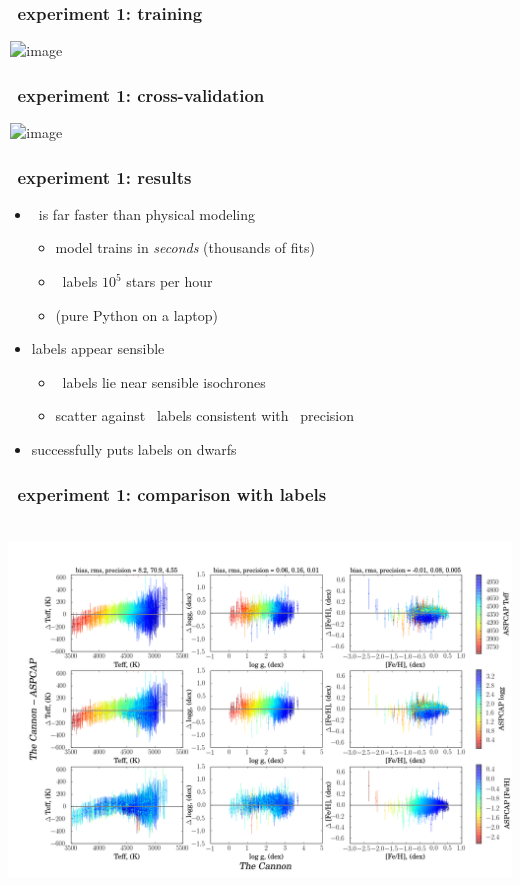 \documentclass[pdftex]{beamer}
\begin{document}
\begin{frame}
  \frametitle{\tc\ experiment 1: training}
  \,\hfill\includegraphics<1>[height=\figureheight]{../documents/paper1/plots/R1_continuum5.png}
\end{frame}

\begin{frame}
  \frametitle{\tc\ experiment 1: cross-validation}
  \,\hfill\includegraphics<1>[height=\figureheight]{../documents/paper1/plots/takeout_histc.png}
\end{frame}

\newcommand{\results}{%
\begin{frame}
  \frametitle{\tc\ experiment 1: results}
  \begin{itemize}
  \item \tc\ is far faster than physical modeling
    \begin{itemize}
    \item model trains in \emph{seconds} (thousands of fits)
    \item \tc\ labels $10^5$ stars per hour
    \item (pure Python on a laptop)
    \end{itemize}
  \item labels appear sensible
    \begin{itemize}
    \item \tc\ labels lie near sensible isochrones
    \item scatter against \apogee\ labels consistent with \apogee\ precision
    \end{itemize}
  \item successfully puts labels on dwarfs
  \end{itemize}
\end{frame}}

\results

\begin{frame}
  \frametitle{\tc\ experiment 1: comparison with \textsl{} labels}
  \,\hfill\includegraphics[height=\figureheight]{../documents/paper1/plots/cplot2.png} 
\end{frame}
\end{document}
